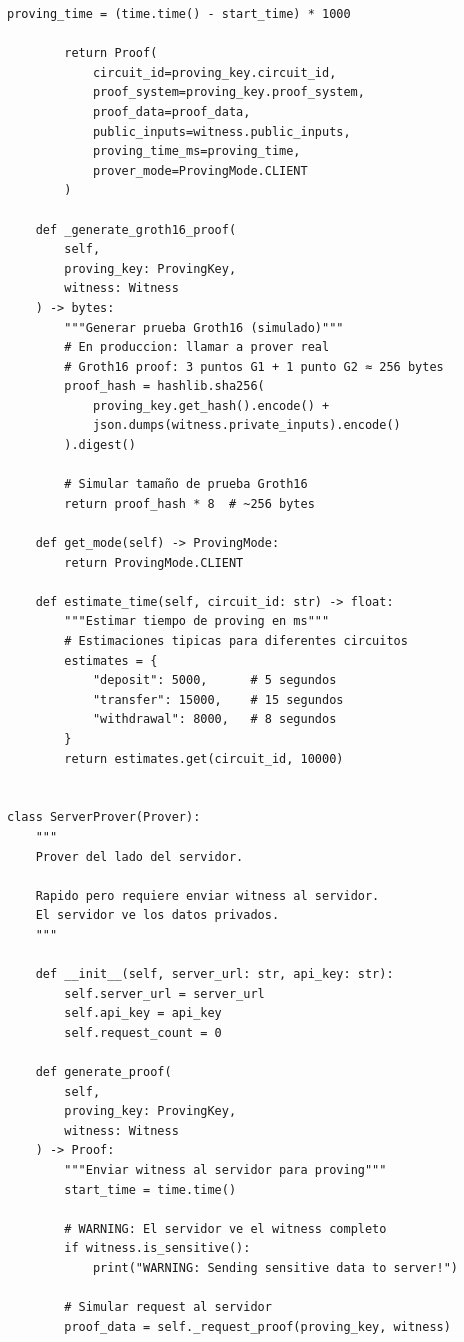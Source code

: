 \documentclass[11pt,a4paper,twoside]{book}
\theoremstyle{definition}
\theoremstyle{remark}
\begin{document}
\begin{lstlisting}[style=python, caption={Infraestructura de proving ZK}]
        proving_time = (time.time() - start_time) * 1000
        
        return Proof(
            circuit_id=proving_key.circuit_id,
            proof_system=proving_key.proof_system,
            proof_data=proof_data,
            public_inputs=witness.public_inputs,
            proving_time_ms=proving_time,
            prover_mode=ProvingMode.CLIENT
        )
    
    def _generate_groth16_proof(
        self,
        proving_key: ProvingKey,
        witness: Witness
    ) -> bytes:
        """Generar prueba Groth16 (simulado)"""
        # En produccion: llamar a prover real
        # Groth16 proof: 3 puntos G1 + 1 punto G2 ≈ 256 bytes
        proof_hash = hashlib.sha256(
            proving_key.get_hash().encode() +
            json.dumps(witness.private_inputs).encode()
        ).digest()
        
        # Simular tamaño de prueba Groth16
        return proof_hash * 8  # ~256 bytes
    
    def get_mode(self) -> ProvingMode:
        return ProvingMode.CLIENT
    
    def estimate_time(self, circuit_id: str) -> float:
        """Estimar tiempo de proving en ms"""
        # Estimaciones tipicas para diferentes circuitos
        estimates = {
            "deposit": 5000,      # 5 segundos
            "transfer": 15000,    # 15 segundos
            "withdrawal": 8000,   # 8 segundos
        }
        return estimates.get(circuit_id, 10000)


class ServerProver(Prover):
    """
    Prover del lado del servidor.
    
    Rapido pero requiere enviar witness al servidor.
    El servidor ve los datos privados.
    """
    
    def __init__(self, server_url: str, api_key: str):
        self.server_url = server_url
        self.api_key = api_key
        self.request_count = 0
        
    def generate_proof(
        self,
        proving_key: ProvingKey,
        witness: Witness
    ) -> Proof:
        """Enviar witness al servidor para proving"""
        start_time = time.time()
        
        # WARNING: El servidor ve el witness completo
        if witness.is_sensitive():
            print("WARNING: Sending sensitive data to server!")
        
        # Simular request al servidor
        proof_data = self._request_proof(proving_key, witness)
        

\end{lstlisting}
\end{document}
